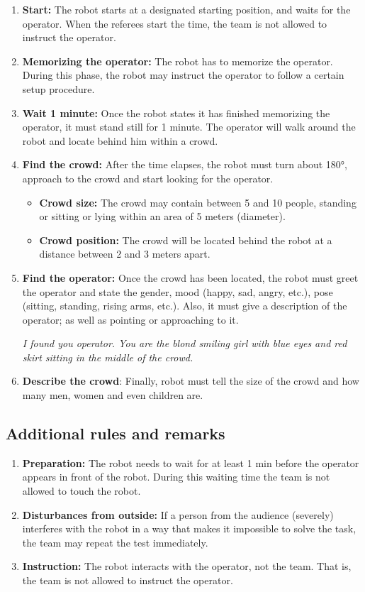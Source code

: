 \begin{enumerate}

\item \textbf{Start:} The robot starts at a designated starting position, and waits for the  operator. When the referees start the time, the team is not allowed to instruct the operator.
\item \textbf{Memorizing the operator:} The robot has to memorize the operator. During this phase, the robot may instruct the operator to follow a certain setup procedure.
\item \textbf{Wait 1 minute:} Once the robot states it has finished memorizing the operator, it must stand still for 1 minute. The operator will walk around the robot and locate behind him within a crowd.
\item \textbf{Find the crowd:} After the time elapses, the robot must turn about 180°, approach to the crowd and start looking for the operator.
\begin{itemize}
\item \textbf{Crowd size:} The crowd may contain between 5 and 10 people, standing or sitting or lying within an  area of 5 meters (diameter).
\item \textbf{Crowd position:} The crowd will be located behind the robot at a distance between 2 and 3 meters apart.
\end{itemize}
\item \textbf{Find the operator:} Once the crowd has been located, the robot must greet the operator and state the gender, mood (happy, sad, angry, etc.), pose (sitting, standing, rising arms, etc.). Also, it must give a description of the operator; as well as pointing or approaching to it.

\textit{I found you operator. You are the blond smiling girl with blue eyes and red skirt sitting in the middle of the crowd.}

\item \textbf{Describe the crowd}: Finally, robot must tell the size of the crowd and how many men, women and even children are.
\end{enumerate}

\subsection{Additional rules and remarks}
\begin{enumerate}
\item \textbf{Preparation:} The robot needs to wait for at least 1 min before the operator appears in front of the robot. During this waiting time the team is not allowed to touch the robot.
\item \textbf{Disturbances from outside:} If a person from the audience (severely) interferes with the robot in a way that makes it impossible to solve the task, the team may repeat the test immediately.
\item \textbf{Instruction:} The robot interacts with the operator, not the team. That is, the team is not allowed to instruct the operator.
\end{enumerate}



